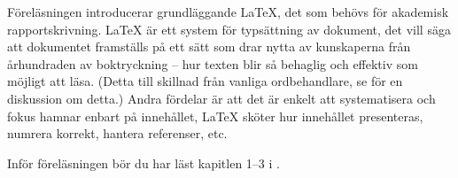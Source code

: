Föreläsningen introducerar grundläggande LaTeX, det som behövs för akademisk 
rapportskrivning.
LaTeX är ett system för typsättning av dokument, det vill säga att dokumentet 
framställs på ett sätt som drar nytta av kunskaperna från århundraden av 
boktryckning -- hur texten blir så behaglig och effektiv som möjligt att läsa.
(Detta till skillnad från vanliga ordbehandlare, se  
\cite{memdesign} för en diskussion om detta.)
Andra fördelar är att det är enkelt att systematisera och fokus hamnar enbart 
på innehållet, LaTeX sköter hur innehållet presenteras, numrera korrekt, 
hantera referenser, etc.

Inför föreläsningen bör du har läst kapitlen 1--3 
i  \cite{Oetiker2011lshort}.
